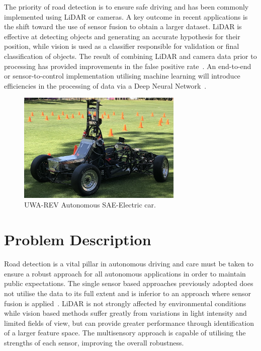 The priority of road detection is to ensure safe driving and has been commonly implemented using LiDAR or cameras. A key outcome in recent applications is the shift toward the use of sensor fusion to obtain a larger dataset. LiDAR is effective at detecting objects and generating an accurate hypothesis for their position, while vision is used as a classifier responsible for validation or final classification of objects. The result of combining LiDAR and camera data prior to processing has provided improvements in the false positive rate~\cite{han_road_2017}. An end-to-end or sensor-to-control implementation utilising machine learning will introduce efficiencies in the processing of data via a Deep Neural Network~\cite{bojarski_end_2016}.

\begin{figure}[ht] 
	\centering    
	\includegraphics[width=0.7\textwidth]{car}
	\caption{UWA-REV Autonomous SAE-Electric car.}
	\label{fig:a:car}
\end{figure}

\section{Problem Description}
Road detection is a vital pillar in autonomous driving and care must be taken to ensure a robust approach for all autonomous applications in order to maintain public expectations. The single sensor based approaches previously adopted does not utilise the data to its full extent and is inferior to an approach where sensor fusion is applied~\cite{han_road_2017}. LiDAR is not strongly affected by environmental conditions while vision based methods suffer greatly from variations in light intensity and limited fields of view, but can provide greater performance through identification of a larger feature space. The multisensory approach is capable of utilising the strengths of each sensor, improving the overall robustness.

